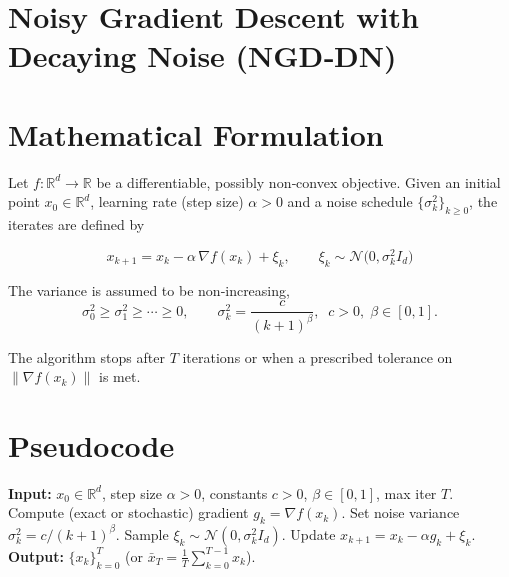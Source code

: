 \documentclass{article}
\newcommand{\norm}[1]{\left\lVert #1\right\rVert}
\newcommand{\R}{\mathbb{R}}
\begin{document}
\section*{Noisy Gradient Descent with Decaying Noise (NGD‑DN)}

\section*{Mathematical Formulation}
Let $f:\R^{d}\to\R$ be a differentiable, possibly non‑convex objective.  
Given an initial point $x_{0}\in\R^{d}$, learning rate (step size) $\alpha>0$ and a
noise schedule $\{\sigma_{k}^{2}\}_{k\ge 0}$, the iterates are defined by  

\[
\boxed{
x_{k+1}=x_{k}-\alpha\,\nabla f(x_{k})+\xi_{k},\qquad 
\xi_{k}\sim\mathcal N\!\big(0,\sigma_{k}^{2} I_{d}\big)
}
\tag{1}
\]

The variance is assumed to be non‑increasing,
\[
\sigma_{0}^{2}\ge\sigma_{1}^{2}\ge\cdots\ge 0,
\qquad 
\sigma_{k}^{2}= \frac{c}{(k+1)^{\beta}},\;\;c>0,\;\beta\in[0,1].
\tag{2}
\]

The algorithm stops after $T$ iterations or when a prescribed tolerance on
$\norm{\nabla f(x_{k})}$ is met.

\section*{Pseudocode}
\begin{algorithm}[H]
\caption{NGD‑DN}
\begin{algorithmic}[1]
\STATE \textbf{Input:} $x_{0}\in\R^{d}$, step size $\alpha>0$, constants $c>0$, $\beta\in[0,1]$, max iter $T$.
    \STATE Compute (exact or stochastic) gradient $g_{k}= \nabla f(x_{k})$.
    \STATE Set noise variance $\sigma_{k}^{2}=c/(k+1)^{\beta}$.
    \STATE Sample $\xi_{k}\sim\mathcal N(0,\sigma_{k}^{2} I_{d})$.
    \STATE Update $x_{k+1}=x_{k}-\alpha g_{k}+\xi_{k}$.
\ENDFOR
\STATE \textbf{Output:} $\{x_{k}\}_{k=0}^{T}$ (or $\bar x_{T}= \frac1T\sum_{k=0}^{T-1}x_{k}$).
\end{algorithmic}
\end{algorithm}
\end{document}
